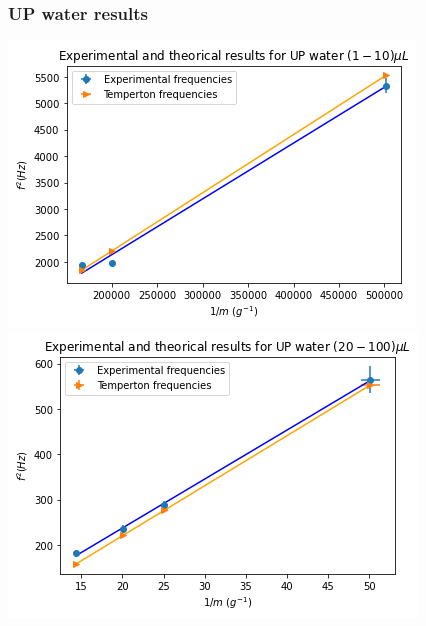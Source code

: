 \documentclass[xcolor=table]{beamer}
\begin{document}
\begin{frame}

\frametitle{UP water results}
\includegraphics[width=.5\columnwidth]{Volumi_piccoli.PNG}
\includegraphics[width=.55\columnwidth]{volumi_grandi.PNG}\\

\end{frame}%
\end{document}

